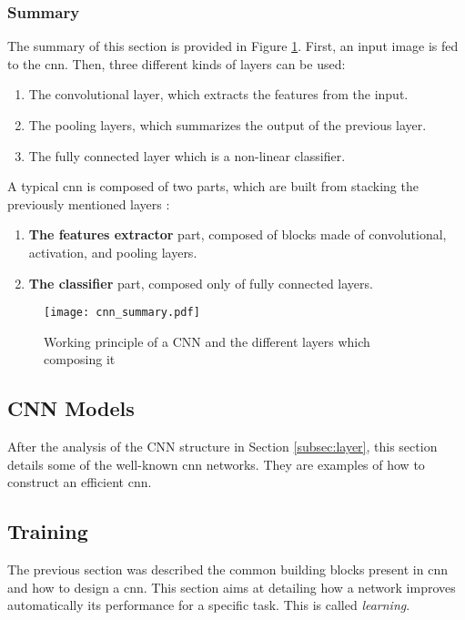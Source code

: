 \subsubsection{Summary}
%
The summary of this section is provided in Figure \ref{fig:layer:summary}. First, an input image is fed to the \acrshort{cnn}. Then, three different kinds of layers can be used:
%
\begin{enumerate}
    \item The convolutional layer, which extracts the features from the input.
    \item The pooling layers, which summarizes the output of the previous layer.
    \item The fully connected layer which is a non-linear classifier.
\end{enumerate}
%
A typical \acrshort{cnn} is composed of two parts, which are built from stacking the previously mentioned layers \cite{matteucci_artificial_2019}:
\begin{enumerate}
    \item \textbf{The features extractor} part, composed of blocks made of convolutional, activation, and pooling layers.
    \item \textbf{The classifier} part, composed only of fully connected layers.
\end{enumerate}
%
\begin{figure}[H]
    \centering
    \texttt{[image: cnn\_summary.pdf]}
    \caption{Working principle of a CNN and the different layers which composing it}
    \label{fig:layer:summary}
\end{figure}
%
\subsection{CNN Models} \label{subsec:models}
After the analysis of the CNN structure in Section \ref{subsec:layer}, this section details some of the well-known \acrshort{cnn} networks. They are examples of how to construct an efficient \acrshort{cnn}.

%

%
%
\subsection{Training} \label{subsec:train}
The previous section was described the common building blocks present in \acrshort{cnn} and how to design a \acrshort{cnn}. This section aims at detailing how a network improves automatically its performance for a specific task. This is called \textit{learning}.

